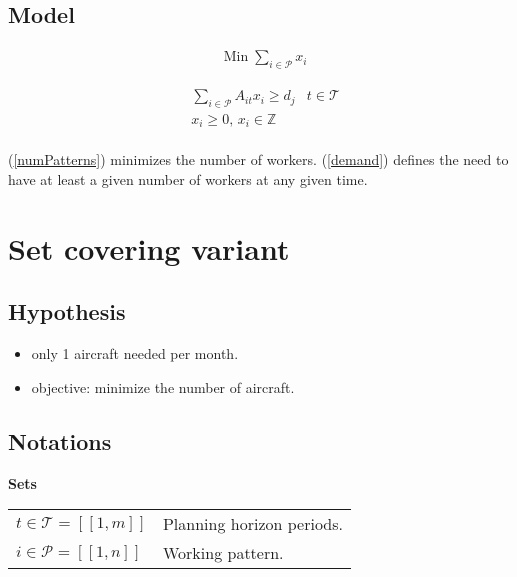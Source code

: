 \documentclass[a4paper,11pt]{article}
\begin{document}
    \subsection{Model}

    \begin{align}
        & \text{Min}\; \sum_{i \in \mathcal{P}} x_i \label{numPatterns}
    \end{align}

    \begin{align}
        & \sum_{i \in \mathcal{P}} A_{it}x_{i} \geq d_j & t \in \mathcal{T} \label{demand} \\
        & x_{i} \geq 0,\, x_{i} \in \mathbb{Z} \\
    \end{align}

    (\ref{numPatterns}) minimizes the number of workers. (\ref{demand}) defines the need to have at least a given number of workers at any given time.  

\clearpage

\section{Set covering variant}

    \subsection{Hypothesis}

    \begin{itemize}
     \item only 1 aircraft needed per month.
     \item objective: minimize the number of aircraft.
    \end{itemize}

    \subsection{Notations}

    \textbf{Sets}

    \begin{tabular}{ll}
    $t\in \mathcal{T} = [\![1, m]\!]$ & Planning horizon periods. \\
    $i \in \mathcal{P} = [\![1, n]\!]$ & Working pattern.\\
    \end{tabular}
\end{document}
